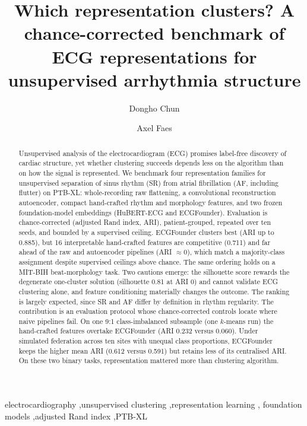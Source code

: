 \documentclass[preprint,11pt]{elsarticle}
\begin{document}
\begin{frontmatter}

\title{Which representation clusters? A chance-corrected benchmark of ECG
representations for unsupervised arrhythmia structure}

\author[uh]{Dongho Chun}
\author[af]{Axel Faes}

\begin{abstract}
Unsupervised analysis of the electrocardiogram (ECG) promises label-free
discovery of cardiac structure, yet whether clustering succeeds depends less on
the algorithm than on how the signal is represented. We benchmark four
representation families for unsupervised separation of sinus rhythm (SR) from
atrial fibrillation (AF, including flutter) on PTB-XL: whole-recording raw flattening, a convolutional
reconstruction autoencoder, compact hand-crafted rhythm and morphology features,
and two frozen foundation-model embeddings (HuBERT-ECG and ECGFounder).
Evaluation is chance-corrected (adjusted Rand index, ARI), patient-grouped,
repeated over ten seeds, and bounded by a supervised ceiling. ECGFounder clusters
best (ARI up to 0.885), but 16 interpretable hand-crafted features are competitive
(0.711) and far ahead of the raw and autoencoder pipelines (ARI $\approx 0$), which
match a majority-class assignment despite supervised ceilings above chance.
The same ordering holds on a MIT-BIH beat-morphology task. Two cautions emerge: the
silhouette score rewards the degenerate one-cluster solution (silhouette 0.81 at
ARI 0) and cannot validate ECG clustering alone, and feature conditioning materially
changes the outcome. The ranking is largely expected, since SR and AF differ by
definition in rhythm regularity. The contribution is an evaluation protocol whose
chance-corrected controls locate where naive pipelines fail. On one 9:1
class-imbalanced subsample (one $k$-means run) the hand-crafted features overtake
ECGFounder (ARI 0.232 versus 0.060).
Under simulated federation across ten sites with unequal class proportions, ECGFounder
keeps the higher mean ARI (0.612 versus 0.591) but retains less of its centralised
ARI. On these two binary tasks, representation mattered more than clustering algorithm.
\end{abstract}

\begin{keyword}
electrocardiography \sep unsupervised clustering \sep representation learning \sep
foundation models \sep adjusted Rand index \sep PTB-XL
\end{keyword}

\end{frontmatter}
\end{document}
